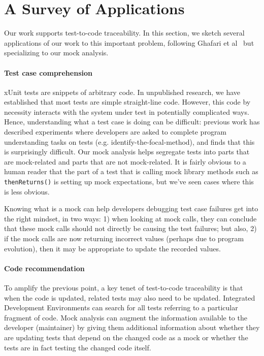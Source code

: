 \section{A Survey of Applications}
\label{sec:applications}

Our work supports test-to-code traceability. In this section, we
sketch several applications of our work to this important problem,
following Ghafari et al~\cite{ghafari15:_autom} but specializing to
our mock analysis.

\paragraph{Test case comprehension} xUnit tests are snippets of arbitrary
code. In unpublished research, we have established that most tests are
simple straight-line code. However, this code by necessity interacts
with the system under test in potentially complicated ways. Hence,
understanding what a test case is doing can be difficult: previous
work has described experiments where developers are asked to complete
program understanding tasks on tests (e.g. identify-the-focal-method),
and finds that this is surprisingly difficult. Our mock analysis helps
segregate tests into parts that are mock-related and parts that are
not mock-related.  It is fairly obvious to a human reader that the
part of a test that is calling mock library methods such as
\texttt{thenReturns()} is setting up mock expectations, but we've seen cases
where this is less obvious.

Knowing what is a mock can help developers debugging test case
failures get into the right mindset, in two ways: 1) when looking at
mock calls, they can conclude that these mock calls should not
directly be causing the test failures; but also, 2) if the mock calls
are now returning incorrect values (perhaps due to program evolution),
then it may be appropriate to update the recorded values.

\paragraph{Code recommendation}
To amplify the previous point, a key tenet of test-to-code
traceability is that when the code is updated, related tests may also
need to be updated. Integrated Development Environments can search for
all tests referring to a particular fragment of code. Mock analysis
can augment the information available to the developer (maintainer) by
giving them additional information about whether they are updating
tests that depend on the changed code as a mock or whether the tests
are in fact testing the changed code itself.

